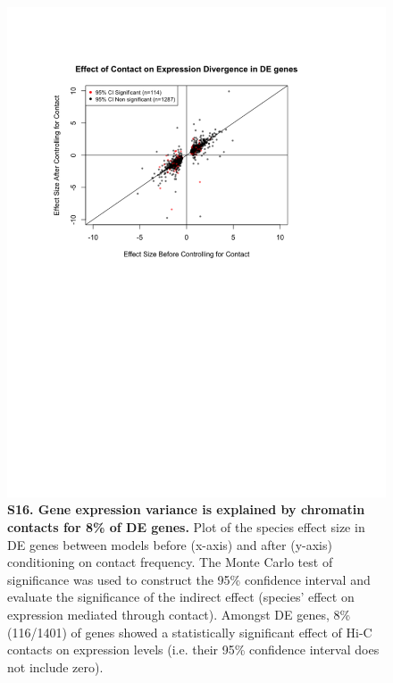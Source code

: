 \begin{figure}[!htb]
\centering
\includegraphics[width=6in]{img/figS16.pdf}
\caption[Gene expression variance is explained by chromatin contacts for 8\% of DE genes.]{\textbf{S16. Gene expression variance is explained by chromatin contacts for 8\% of DE genes.} Plot of the species effect size in DE genes between models before (x-axis) and after (y-axis) conditioning on contact frequency. The Monte Carlo test of significance was used to construct the 95\% confidence interval and evaluate the significance of the indirect effect (species' effect on expression mediated through contact). Amongst DE genes, 8\% (116/1401) of genes showed a statistically significant effect of Hi-C contacts on expression levels (i.e. their 95\% confidence interval does not include zero).}
\label{fig:ch02-figS16}
\end{figure}


